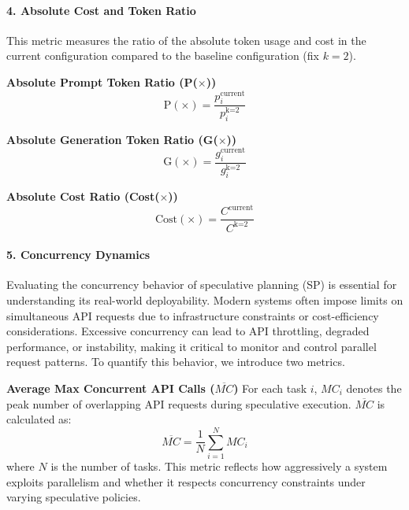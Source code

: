 \paragraph{4. Absolute Cost and Token Ratio}
This metric measures the ratio of the absolute token usage and cost in the current configuration compared to the baseline configuration (fix $k=2$).

\textbf{Absolute Prompt Token Ratio (P($\times$))}
\[
\text{P}(\times) = \frac{p^{\text{current}}_i}{p^{\text{k=2}}_i}
\]

\textbf{Absolute Generation Token Ratio (G($\times$))} 
\[
\text{G}(\times) = \frac{g^{\text{current}}_i}{g^{\text{k=2}}_i}
\]

\textbf{Absolute Cost Ratio (Cost($\times$))}
\[
\text{Cost}(\times) = \frac{C^{\text{current}}}{C^{\text{k=2}}}
\]

\paragraph{5. Concurrency Dynamics}
Evaluating the concurrency behavior of speculative planning (SP) is essential for understanding its real-world deployability. Modern systems often impose limits on simultaneous API requests due to infrastructure constraints or cost-efficiency considerations. Excessive concurrency can lead to API throttling, degraded performance, or instability, making it critical to monitor and control parallel request patterns. To quantify this behavior, we introduce two metrics.

\textbf{Average Max Concurrent API Calls ($\overline{MC}$)} For each task $i$, $MC_i$ denotes the peak number of overlapping API requests during speculative execution. $\overline{MC}$ is calculated as:
\begin{equation}
\overline{MC} = \frac{1}{N} \sum_{i=1}^N {MC}_i
\end{equation}
where $N$ is the number of tasks. This metric reflects how aggressively a system exploits parallelism and whether it respects concurrency constraints under varying speculative policies.

